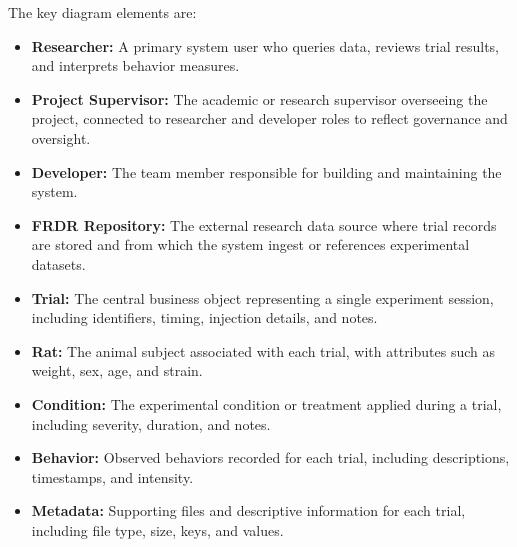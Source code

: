 \documentclass[12pt]{article}
\begin{document}
The key diagram elements are:
\begin{itemize}
    \item \textbf{Researcher:} A primary system user who queries data, reviews trial results, and interprets behavior measures.
    \item \textbf{Project Supervisor:} The academic or research supervisor overseeing the project, connected to researcher and developer roles to reflect governance and oversight.
    \item \textbf{Developer:} The team member responsible for building and maintaining the system.
    \item \textbf{FRDR Repository:} The external research data source where trial records are stored and from which the system ingest or references experimental datasets.
    \item \textbf{Trial:} The central business object representing a single experiment session, including identifiers, timing, injection details, and notes.
    \item \textbf{Rat:} The animal subject associated with each trial, with attributes such as weight, sex, age, and strain.
    \item \textbf{Condition:} The experimental condition or treatment applied during a trial, including severity, duration, and notes.
    \item \textbf{Behavior:} Observed behaviors recorded for each trial, including descriptions, timestamps, and intensity.
    \item \textbf{Metadata:} Supporting files and descriptive information for each trial, including file type, size, keys, and values.
\end{itemize}
\end{document}
